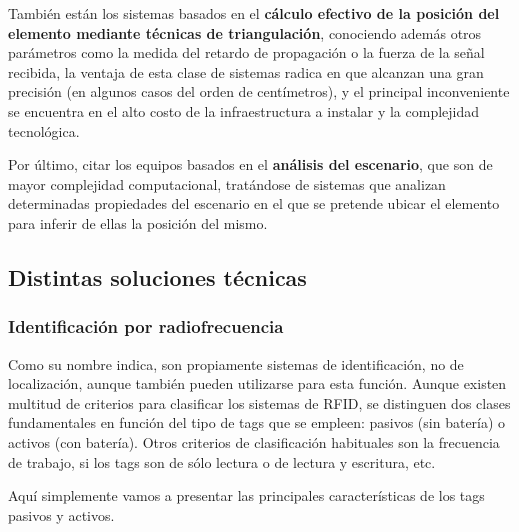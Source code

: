 También están los sistemas basados en el \textbf{cálculo efectivo de la posición del elemento mediante técnicas de triangulación}, conociendo además otros parámetros como la medida del retardo de propagación o la fuerza de la señal recibida, la ventaja de esta clase de sistemas radica en que alcanzan una gran precisión (en algunos casos del orden de centímetros), y el principal inconveniente se encuentra en el alto costo de la infraestructura a instalar y la complejidad tecnológica.

Por último, citar los equipos basados en el \textbf{análisis del escenario}, que son de mayor complejidad computacional, tratándose de sistemas que analizan determinadas propiedades del escenario en el que se pretende ubicar el elemento para inferir de ellas la posición del mismo. \cite{ILS}

\subsection{Distintas soluciones técnicas}

\subsubsection{Identificación por radiofrecuencia}

Como su nombre indica, son propiamente sistemas de identificación, no de localización, aunque también pueden utilizarse para esta función. Aunque existen multitud de criterios para clasificar los sistemas de RFID, se distinguen dos clases fundamentales en función del tipo de tags que se empleen: pasivos (sin batería) o activos (con batería). Otros criterios de clasificación habituales son la frecuencia de trabajo, si los tags son de sólo lectura o de lectura y escritura, etc. 

Aquí simplemente vamos a presentar las principales características de los tags pasivos y activos. 

